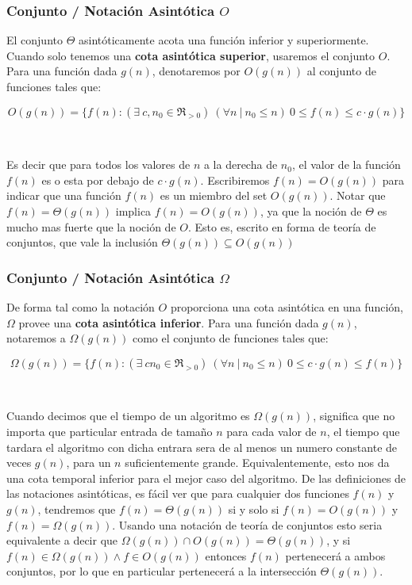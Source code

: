 \subsubsection{Conjunto / Notaci\'on Asint\'otica $O$}

El conjunto $\Theta$ asint\'oticamente acota una funci\'on inferior y superiormente. Cuando solo tenemos una \textbf{cota asint\'otica superior}, usaremos el conjunto $O$. Para una funci\'on dada $g(n)$, denotaremos por $O(g(n))$ al conjunto de funciones tales que:

\begin{equation*}
 O(g(n)) = \{ f(n) : (\exists\ c, n_0 \in \Re_{>0}) \ (\forall n\ |\ n_0 \leq n)\ 0 \leq f(n) \leq c \cdot g(n) \}
\end{equation*}

~

Es decir que para todos los valores de $n$ a la derecha de $n_0$, el valor de la funci\'on $f(n)$ es o esta por debajo de $c \cdot g(n)$. Escribiremos $f(n) = O(g(n))$ para indicar que una funci\'on $f(n)$ es un miembro del set $O(g(n))$. Notar que $f(n) = \Theta(g(n))$ implica $f(n) = O(g(n))$, ya que la noci\'on de $\Theta$ es mucho mas fuerte que la noci\'on de $O$. Esto es, escrito en forma de teor\'ia de conjuntos, que vale la inclusi\'on $\Theta(g(n)) \subseteq O(g(n))$

\subsubsection{Conjunto / Notaci\'on Asint\'otica $\Omega$}

De forma tal como la notaci\'on $O$ proporciona una cota asint\'otica en una funci\'on, $\Omega$ provee una \textbf{cota asint\'otica inferior}. Para una funci\'on dada $g(n)$, notaremos a $\Omega(g(n))$ como el conjunto de funciones tales que:

\begin{equation*}
 \Omega(g(n)) = \{ f(n) : (\exists\ c n_0 \in \Re_{>0}) \ (\forall n\ |\ n_0 \leq n)\ 0 \leq c \cdot g(n) \leq f(n) \}
\end{equation*}

~

Cuando decimos que el tiempo de un algoritmo es $\Omega(g(n))$, significa que no importa que particular entrada de tama\~no $n$ para cada valor de $n$, el tiempo que tardara el algoritmo con dicha entrara sera de al menos un numero constante de veces $g(n)$, para un $n$ suficientemente grande. Equivalentemente, esto nos da una cota temporal inferior para el mejor caso del algoritmo. De las definiciones de las notaciones asint\'oticas, es f\'acil ver que para cualquier dos funciones $f(n)$ y $g(n)$, tendremos que $f(n) = \Theta(g(n))$ si y solo si $f(n) = O(g(n))$ y $f(n) = \Omega(g(n))$. Usando una notaci\'on de teor\'ia de conjuntos esto seria equivalente a decir que $\Omega(g(n)) \cap O(g(n)) = \Theta(g(n))$, y si $f(n) \in \Omega(g(n)) \land f \in O(g(n))$ entonces $f(n)$ pertenecer\'a a ambos conjuntos, por lo que en particular pertenecer\'a a la intersecci\'on $\Theta(g(n))$.


